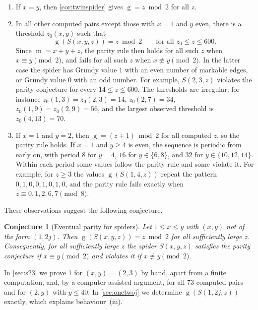 \documentclass[11pt]{amsart}
\newtheorem{conjecture}[theorem]{Conjecture}
\theoremstyle{definition}
\theoremstyle{remark}
\newcommand{\gv}{\operatorname{g}}           %
\newcommand{\m}{\operatorname{m}}
\newcommand{\Sp}{S}
\begin{document}
\begin{enumerate}[label=(\roman*),leftmargin=*]
\item If $x=y$, then \cref{cor:twinspider} gives $\gv=z\bmod 2$ for all $z$.
\item In all other computed pairs except those with $x=1$ and $y$ even, there is a threshold $z_0(x,y)$ such that
\[
  \gv(\Sp(x,y,z))=z\bmod 2\qquad\text{for all } z_0\le z\le 600.
\]
Since $\m=x+y+z$, the parity rule then holds for all such $z$ when $x\equiv y\pmod 2$, and fails for all such $z$ when $x\not\equiv y\pmod2$. In the latter case the spider has Grundy value $1$ with an even number of markable edges, or Grundy value $0$ with an odd number. For example, $\Sp(2,3,z)$ violates the parity conjecture for every $14\le z\le 600$. The thresholds are irregular; for instance $z_0(1,3)=z_0(2,3)=14$, $z_0(2,7)=34$, $z_0(1,9)=z_0(2,9)=56$, and the largest observed threshold is $z_0(4,13)=70$.
\item If $x=1$ and $y=2$, then $\gv=(z+1)\bmod 2$ for all computed $z$, so the parity rule holds. If $x=1$ and $y\ge4$ is even, the sequence is periodic from early on, with period $8$ for $y=4$, $16$ for $y\in\{6,8\}$, and $32$ for $y\in\{10,12,14\}$. Within each period some values follow the parity rule and some violate it. For example, for $z\ge3$ the values $\gv(\Sp(1,4,z))$ repeat the pattern $0,1,0,0,1,0,1,0$, and the parity rule fails exactly when $z\equiv 0,1,2,6,7\pmod 8$.
\end{enumerate}

These observations suggest the following conjecture.

\begin{conjecture}[Eventual parity for spiders]\label{conj:eventual}
Let $1\le x\le y$ with $(x,y)$ not of the form $(1,2j)$. Then $\gv(\Sp(x,y,z))=z\bmod2$ for all sufficiently large $z$. Consequently, for all sufficiently large $z$ the spider $\Sp(x,y,z)$ satisfies the parity conjecture if $x\equiv y\pmod2$ and violates it if $x\not\equiv y\pmod 2$.
\end{conjecture}

In \cref{sec:s23} we prove \cref{conj:eventual} for $(x,y)=(2,3)$ by hand, apart from a finite computation, and, by a computer-assisted argument, for all $73$ computed pairs and for $(2,y)$ with $y\le 40$. In \cref{sec:onetwoj} we determine $\gv(\Sp(1,2j,z))$ exactly, which explains behaviour~(iii).
\end{document}
